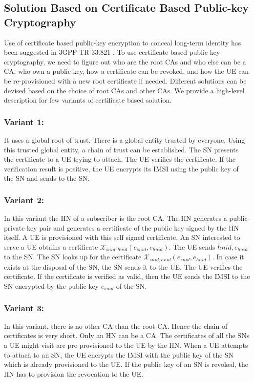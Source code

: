 \documentclass{llncs} %
\begin{document}
\subsection{Solution Based on Certificate Based Public-key Cryptography} 
\label{sub_sec:solution_certificate}
Use of certificate based public-key encryption to conceal long-term identity has been suggested in 3GPP TR 33.821 \cite{TR33821}. To use certificate based public-key cryptography, we need to figure out who are the root CAs and who else can be a CA, who own a public key, how a certificate can be revoked, and how the UE can be re-provisioned with a new root certificate if needed. Different solutions can be devised based on the choice of root CAs and other CAs. We provide a high-level description for few variants of certificate based solution.

\subsubsection{Variant 1:}
It uses a global root of trust. There is a global entity trusted by everyone. Using this trusted global entity, a chain of trust can be established. The SN presents the certificate to a UE trying to attach. The UE verifies the certificate. If the verification result is positive, the UE encrypts its IMSI using the public key of the SN and sends to the SN. 

\subsubsection{Variant 2:}
In this variant the HN of a subscriber is the root CA. The HN generates a public-private key pair and generates a certificate of the public key signed by the HN itself. A UE is provisioned with this self signed certificate. An SN interested to serve a UE obtains a certificate $\mathcal{X}_{snid,hnid} (e_{snid},e_{hnid})$. The UE sends $hnid,e_{hnid}$ to the SN. The SN looks up for the certificate $\mathcal{X}_{snid,hnid} (e_{snid},e_{hnid})$. In case it exists at the disposal of the SN, the SN sends it to the UE. The UE verifies the certificate. If the certificate is verified as valid, then the UE sends the IMSI to the SN encrypted by the public key $e_{snid}$ of the SN.

\subsubsection{Variant 3:}
In this variant, there is no other CA than the root CA. Hence the chain of certificates is very short. Only an HN can be a CA. The certificates of all the SNs a UE might visit are pre-provisioned to the UE by the HN. When a UE attempts to attach to an SN, the UE encrypts the IMSI with the public key of the SN which is already provisioned to the UE. If the public key of an SN is revoked, the HN has to provision the revocation to the UE.
\end{document}
